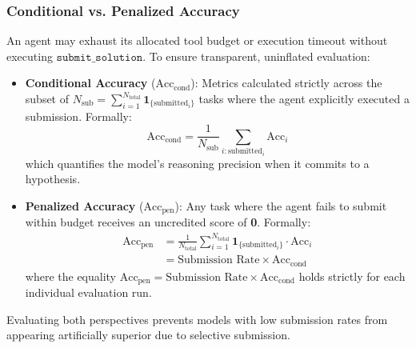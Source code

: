 \documentclass[sigconf]{acmart}
\begin{document}
\subsubsection{Conditional vs. Penalized Accuracy}
An agent may exhaust its allocated tool budget or execution timeout without executing $\texttt{submit\_solution}$. To ensure transparent, uninflated evaluation:
\begin{itemize}
    \item \textbf{Conditional Accuracy} ($\text{Acc}_{\text{cond}}$): Metrics calculated strictly across the subset of $N_{\text{sub}} = \sum_{i=1}^{N_{\text{total}}} \mathbf{1}_{\{\text{submitted}_i\}}$ tasks where the agent explicitly executed a submission. Formally:
    \begin{equation}
        \text{Acc}_{\text{cond}} = \frac{1}{N_{\text{sub}}} \sum_{i: \text{submitted}_i} \text{Acc}_i
    \end{equation}
    which quantifies the model's reasoning precision when it commits to a hypothesis.
    \item \textbf{Penalized Accuracy} ($\text{Acc}_{\text{pen}}$): Any task where the agent fails to submit within budget receives an uncredited score of \textbf{0}. Formally:
    \begin{equation}
    \begin{split}
        \text{Acc}_{\text{pen}} &= \frac{1}{N_{\text{total}}} \sum_{i=1}^{N_{\text{total}}} \mathbf{1}_{\{\text{submitted}_i\}} \cdot \text{Acc}_i \\
        &= \text{Submission Rate} \times \text{Acc}_{\text{cond}}
    \end{split}
    \end{equation}
    where the equality $\text{Acc}_{\text{pen}} = \text{Submission Rate} \times \text{Acc}_{\text{cond}}$ holds strictly for each individual evaluation run.
\end{itemize}
Evaluating both perspectives prevents models with low submission rates from appearing artificially superior due to selective submission.
\end{document}
